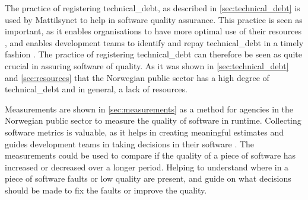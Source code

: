 The practice of registering \gls{technical_debt}, as described in \autoref{sec:technical_debt} is used by Mattilsynet to help in software quality assurance. This practice is seen as important, as it enables organisations to have more optimal use of their resources \cite{mv_2022}, and enables development teams to identify and repay \gls{technical_debt} in a timely fashion \cite{mv_2022}. The practice of registering \gls{technical_debt} can therefore be seen as quite crucial in assuring software of quality. As it was shown in \autoref{sec:technical_debt} and \autoref{sec:resources} that the Norwegian public sector has a high degree of \gls{technical_debt} and in general, a lack of resources.


Measurements are shown in \autoref{sec:measurements} as a method for agencies in the Norwegian public sector to measure the quality of software in runtime. Collecting software metrics is valuable, as it helps in creating meaningful estimates and guides development teams in taking decisions in their software \cite{jkc_2010}. The measurements could be used to compare if the quality of a piece of software has increased or decreased over a longer period. Helping to understand where in a piece of software faults or low quality are present, and guide on what decisions should be made to fix the faults or improve the quality.


